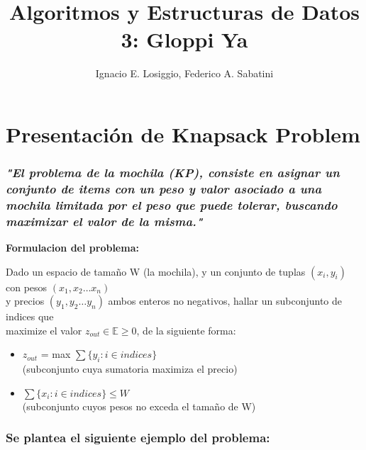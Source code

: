 \documentclass[fleqn, 11pt]{article}
\title{Algoritmos y Estructuras de Datos 3: Gloppi Ya}
\author{Ignacio E. Losiggio, Federico A. Sabatini}
\begin{document}
\maketitle
\section{Presentación de Knapsack Problem}

\subsubsection{
\textit{"El problema de la mochila (KP), consiste en asignar un conjunto de items con un peso y valor asociado a una mochila limitada por el peso que puede tolerar, buscando maximizar el valor de la misma."} }


\textbf{Formulacion del problema:}

Dado un espacio de tamaño W (la mochila), y un conjunto de tuplas $(x_i, y_i)$ con pesos $(x_1, x_2 \dots x_n)$ \\
y precios $(y_1, y_2 \dots y_n)$ ambos enteros no negativos, hallar un subconjunto de indices que \\
maximize el valor $z_{out} \in\mathbb{E} \geq 0$, de la siguiente forma:

\begin{itemize}
	\item $z_{out} $ = max $\sum \{ y_i : i \in indices \} $ \\ (subconjunto cuya sumatoria maximiza el precio)
	\item $\sum \{ x_i : i \in indices \} \le W $ \\ (subconjunto cuyos pesos no exceda el tamaño de W)
\end{itemize}

\subsubsection{Se plantea el siguiente ejemplo del problema:}
\end{document}

